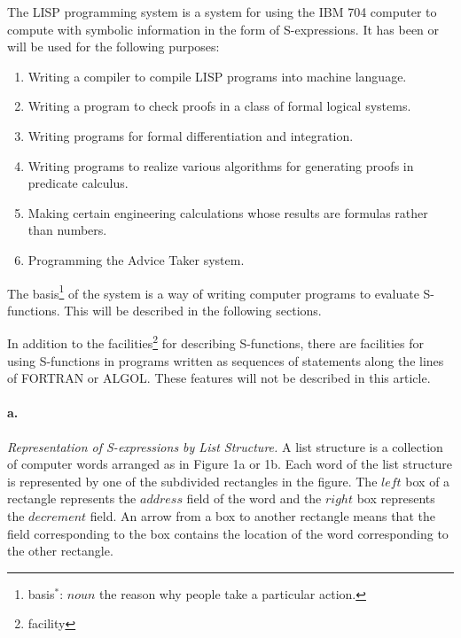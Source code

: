 \documentclass[11pt, a4paper]{article}
\begin{document}
The LISP programming system is a system for using the IBM 704 computer to
compute with symbolic information in the form of S-expressions. It has been or
will be used for the following purposes:
\begin{enumerate}
\item Writing a compiler to compile LISP programs into machine language.
\item Writing a program to check proofs in a class of formal logical systems.
\item Writing programs for formal differentiation and integration.
\item Writing programs to realize various algorithms for generating proofs in
  predicate calculus.
\item Making certain engineering calculations whose results are formulas rather
  than numbers.
\item Programming the Advice Taker system.
\end{enumerate}

The
basis\footnote{basis$^*$: $noun$ the reason why people take a particular
  action.}
of the system is a way of writing computer programs to evaluate
S-functions. This will be described in the following sections.

In addition to the
facilities\footnote{facility}
for describing S-functions, there are facilities
for using S-functions in programs written as sequences of statements along the
lines of FORTRAN or ALGOL. These features will not be described in this
article.

\paragraph{a.}\textit{Representation of S-expressions by List Structure.}
A list structure is a collection of computer words arranged as in Figure 1a or
1b. Each word of the list structure is represented by one of the subdivided
rectangles in the figure. The $left$ box of a rectangle represents the $address$
field of the word and the $right$ box represents the $decrement$ field. An arrow
from a box to another rectangle means that the field corresponding to the box
contains the location of the word corresponding to the other rectangle.
\end{document}
